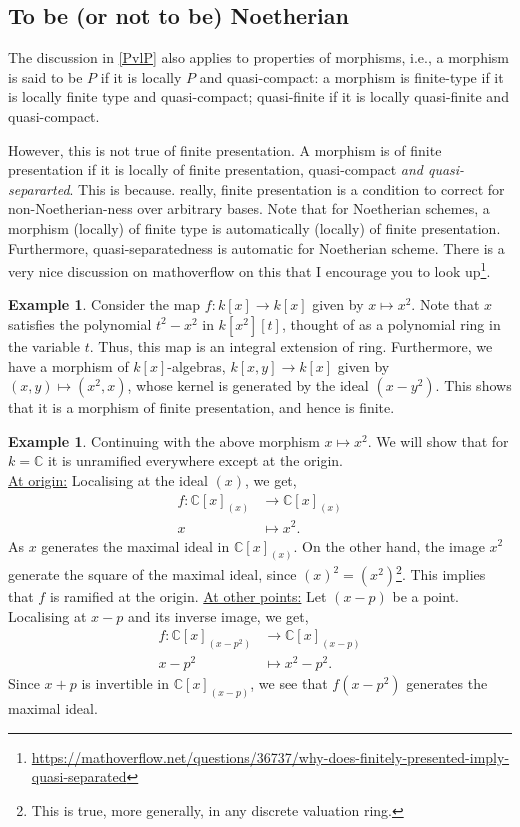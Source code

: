 \documentclass[11pt]{amsart}
\newcommand{\C}{{\mathbb C}}
\theoremstyle{definition}
\newtheorem{example}[theorem]{Example}
\begin{document}
\subsection{To be (or not to be) Noetherian} The discussion in \ref{PvlP} also applies to properties of morphisms, i.e., a morphism is said to be $P$ if it is locally $P$ and quasi-compact: a morphism is finite-type if it is locally finite type and quasi-compact; quasi-finite if it is locally quasi-finite and quasi-compact.

However, this is not true of finite presentation. A morphism is of finite presentation if it is locally of finite presentation, quasi-compact \textit{and quasi-separarted}. This is because. really, finite presentation is a condition to correct for non-Noetherian-ness over arbitrary bases. Note that for Noetherian schemes, a morphism (locally) of finite type is automatically (locally) of finite presentation. Furthermore, quasi-separatedness is automatic for Noetherian scheme. There is a very nice discussion on mathoverflow on this that I encourage you to look up\footnote{\href{https://mathoverflow.net/questions/36737/why-does-finitely-presented-imply-quasi-separated}{https://mathoverflow.net/questions/36737/why-does-finitely-presented-imply-quasi-separated}}. 


\begin{example}
	Consider the map $f:k[x]\rightarrow k[x]$ given by $x\mapsto x^2$. Note that $x$ satisfies the polynomial $t^2 - x^2$ in $k[x^2][t]$, thought of as a polynomial ring in the variable $t$. Thus, this map is an integral extension of ring. Furthermore, we have a morphism of $k[x]$-algebras, $k[x,y]\rightarrow k[x]$ given by $(x,y)\mapsto (x^2,x)$, whose kernel is generated by the ideal $(x-y^2)$. This shows that it is a morphism of finite presentation, and hence is finite.
\end{example}

\begin{example}
	Continuing with the above morphism $x\mapsto x^2$. We will show that for $k=\C$  it is unramified everywhere except at the origin.\\
	\underline{At origin:} Localising at the ideal $(x)$, we get,
	\begin{align*}
	f: \C[x]_{(x)}&\rightarrow \C[x]_{(x)}\\
	x &\mapsto x^2.
	\end{align*}
	As $x$ generates the maximal ideal in $\C[x]_{(x)}$. On the other hand, the image $x^2$ generate the square of the maximal ideal, since $(x)^2=(x^2)$\footnote{This is true, more generally, in any discrete valuation ring.}. This implies that $f$ is ramified at the origin.
	\underline{At other points:} Let $(x-p)$ be a point. Localising at $x-p$ and its inverse image, we get,
	\begin{align*}
	f: \C[x]_{(x-p^2)}&\rightarrow \C[x]_{(x-p)}\\
	x-p^2 &\mapsto x^2-p^2.
	\end{align*}
	Since $x+p$ is invertible in $\C[x]_{(x-p)}$, we see that $f(x-p^2)$ generates the maximal ideal.
\end{example}
	
\end{document}
